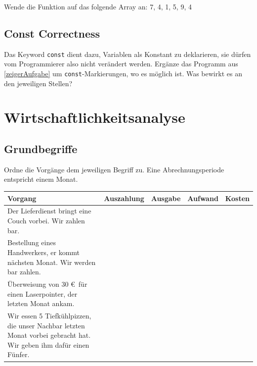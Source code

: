 \documentclass[11pt, a4paper]{article}
\begin{document}
Wende die Funktion auf das folgende Array an:
7, 4, 1, 5, 9, 4

\subsection{Const Correctness}
Das Keyword \texttt{const} dient dazu, Variablen als Konstant zu deklarieren, sie dürfen vom Programmierer also nicht verändert werden. Ergänze das Programm aus \ref{zeigerAufgabe} um \texttt{const}-Markierungen, wo es möglich ist. Was bewirkt es an den jeweiligen Stellen?

\newpage
\section{Wirtschaftlichkeitsanalyse}
\subsection{Grundbegriffe}
Ordne die Vorgänge dem jeweiligen Begriff zu. Eine Abrechnungsperiode entspricht einem Monat.

\begin{tabularx}{\columnwidth}{X|c|c|c|c}
	Vorgang & Auszahlung & Ausgabe & Aufwand & Kosten \\ \hline
	Der Lieferdienst bringt eine Couch vorbei. Wir zahlen bar. &   &   &  &  \\ \hline
	Bestellung eines Handwerkers, er kommt nächsten Monat. Wir werden bar zahlen. &  &  &  &  \\ \hline
	Überweisung von 30 \euro \ für einen Laserpointer, der letzten Monat ankam. &   &  &  & \\ \hline
	Wir essen 5 Tiefkühlpizzen, die unser Nachbar letzten Monat vorbei gebracht hat. Wir geben ihm dafür einen Fünfer. &   &  &   &  
\end{tabularx}
\end{document}
